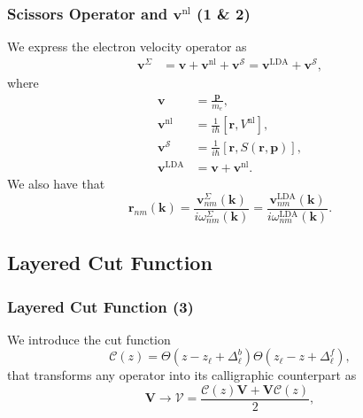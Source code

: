 \documentclass{beamer}
\begin{document}
\begin{frame}
\frametitle{Scissors Operator and
\texorpdfstring{$\mathbf{v}^{\mathrm{nl}}$}{vnl} (1 \& 2)}
We express the electron velocity operator as
\begin{equation*}\label{vop2}
\begin{split}
\mathbf{v}^{\Sigma}
&=\mathbf{v} + \mathbf{v}^{\mathrm{nl}} 
+ \mathbf{v}^{\mathcal{S}}
= \mathbf{v}^\mathrm{LDA} + \mathbf{v}^{\mathcal{S}},
\end{split}
\end{equation*}
where
\begin{equation*}\label{conhr}
\begin{split}
\mathbf{v} &=\frac{\mathbf{p}}{m_{e}},\\
\mathbf{v}^{\mathrm{nl}} &= \frac{1}{i\hbar}
  \left[\mathbf{r},V^{\mathrm{nl}}\right],\\
\mathbf{v}^{\mathcal{S}} &= \frac{1}{i\hbar}
  \left[\mathbf{r},S(\mathbf{r},\mathbf{p})\right],\\
\mathbf{v}^\mathrm{LDA} &= \mathbf{v}+\mathbf{v}^{\mathrm{nl}}.
\end{split}
\end{equation*}
We also have that
\begin{equation*}
\mathbf{r}_{nm}(\mathbf{k})
= \frac{\mathbf{v}^{\Sigma}_{nm}(\mathbf{k})}{i\omega^{\Sigma}_{nm}(\mathbf{k})}
= \frac{\mathbf{v}^{\mathrm{LDA}}_{nm}(\mathbf{k})}
       {i\omega^{\mathrm{LDA}}_{nm}(\mathbf{k})}.
\end{equation*} 
\end{frame}



\subsection{Layered Cut Function}

\begin{frame}
\frametitle{Layered Cut Function (3)}
We introduce the cut function
\begin{equation*}
{\boldsymbol{\mathcal{C}}}(z)=\Theta(z-z_\ell+\Delta_\ell^{b})  
            \Theta(z_\ell-z+\Delta_\ell^f),
\label{sz}
\end{equation*}
that transforms any operator into its calligraphic counterpart as
\begin{equation*}
\mathbf{V} \to \boldsymbol{\mathcal{V}}
= \frac{\boldsymbol{\mathcal{C}}(z) \mathbf{V}
+ \mathbf{V} \boldsymbol{\mathcal{C}}(z)}{2},
\label{vcali}
\end{equation*} 
\end{frame}
\end{document}
